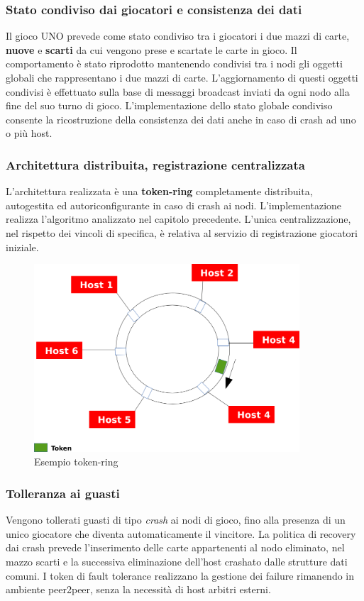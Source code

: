 \documentclass[10pt,a4paper]{article}
\begin{document}
\subsubsection{Stato condiviso dai giocatori e consistenza dei dati}
Il gioco UNO prevede come stato condiviso tra i giocatori i due mazzi di carte, \textbf{nuove} e \textbf{scarti} da cui vengono prese e scartate le carte in gioco. Il comportamento è stato riprodotto mantenendo condivisi tra i nodi gli oggetti globali che rappresentano i due mazzi di carte. L'aggiornamento di questi oggetti condivisi è effettuato sulla base di messaggi broadcast inviati da ogni nodo alla fine del suo turno di gioco. L'implementazione dello stato globale condiviso consente la ricostruzione della consistenza dei dati anche in caso di crash ad uno o più host.

\subsubsection{Architettura distribuita, registrazione centralizzata}
L'architettura realizzata è una \textbf{token-ring} completamente distribuita, autogestita ed autoriconfigurante in caso di crash ai nodi. L'implementazione realizza l'algoritmo analizzato nel capitolo precedente. L'unica centralizzazione, nel rispetto dei vincoli di specifica, è relativa al servizio di registrazione giocatori iniziale.

\begin{figure}[H]
\begin{center}
\includegraphics[height=7cm, keepaspectratio]{token-ring.png}
\caption{Esempio token-ring}
\end{center}
\end{figure}

\subsubsection{Tolleranza ai guasti}
Vengono tollerati guasti di tipo \textit{crash} ai nodi di gioco, fino alla presenza di un unico giocatore che diventa automaticamente il vincitore. La politica di recovery dai crash prevede l'inserimento delle carte appartenenti al nodo eliminato, nel mazzo scarti e la successiva eliminazione dell'host crashato dalle strutture dati comuni. I token di fault tolerance realizzano la gestione dei failure rimanendo in ambiente peer2peer, senza la necessità di host arbitri esterni.
\end{document}
